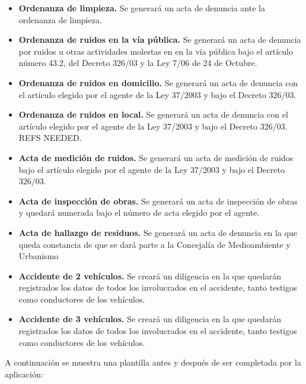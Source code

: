 \begin{itemize}
	\item \textbf{Ordenanza de limpieza. } Se generará un acta de denuncia ante la ordenanza de limpieza.
	\item \textbf{Ordenanza de ruidos en la vía pública. } Se generará un acta de denuncia por ruidos u otras actividades molestas en en la vía pública bajo el artículo número
	43.2, del Decreto 326/03 y la Ley 7/06 de 24 de Octubre.
	\item \textbf{Ordenanza de ruidos en domicilio. } Se generará un acta de denuncia con el artículo elegido por el agente de la Ley 37/2003 y bajo el Decreto 326/03.
	\item \textbf{Ordenanza de ruidos en local. }  Se generará un acta de denuncia con el artículo elegido por el agente de la Ley 37/2003 y bajo el Decreto 326/03. REFS NEEDED.
	\item \textbf{Acta de medición de ruidos. } Se generará un acta de medición de ruidos bajo el artículo elegido por el agente de la Ley 37/2003 y bajo el Decreto 326/03.
	\item \textbf{Acta de inspección de obras. }  Se generará un acta de inspección de obras y quedará numerada bajo el número de acta elegido por el agente.
	\item \textbf{Acta de hallazgo de residuos. } Se generará un acta de denuncia en la que queda constancia de que se dará parte a la Concejalía de Medioambiente y Urbanismo
	\item \textbf{Accidente de 2 vehículos. } Se creará un diligencia en la que quedarán registrados los datos de todos los involucrados en el accidente, tanto testigos como 
	conductores de los vehículos.
	\item \textbf{Accidente de 3 vehículos. } Se creará un diligencia en la que quedarán registrados los datos de todos los involucrados en el accidente, tanto testigos como 
	conductores de los vehículos.
\end{itemize}

A continuación se muestra una plantilla antes y después de ser completada por la aplicación:

